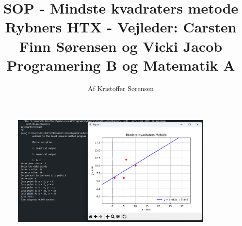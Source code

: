 \title{
    SOP - Mindste kvadraters metode \\ 
    \large{Rybners HTX - Vejleder: Carsten Finn Sørensen og Vicki Jacob} \\
    \small{Programering B og Matematik A}
}
\author{Af Kristoffer Sørensen}
\thispagestyle{empty}
\maketitle
\begin{figure}[h!]
    \centering
    \includegraphics[width=0.9\textwidth]{figures/forsideimg.png}
    \label{fig:Forsideimg}
\end{figure}
\newpage
